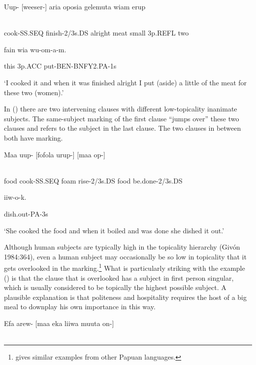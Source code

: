 \ea%
\label{ex:x1483}
\gll Uup-  [weeser-]  aria  oposia  gelemuta  wiam  erup \\
      \\
\glt
\z

cook-SS.SEQ  finish-2/3s.DS  alright  meat  small  3p.REFL  two

fain  wia  wu-om-a-m.

this  3p.ACC  put-BEN-BNFY2.PA-1s

`I cooked it and when it was finished alright I put (aside) a little of the meat for these two (women).'

In () there are two intervening clauses with different low-topicality inanimate subjects. The same-subject marking of the first clause ``jumps over'' these two clauses and refers to the subject in the last clause. The two clauses in between both have  marking. 

\ea%
\label{ex:x1476}
\gll Maa  uup- [fofola  urup-]  [maa  op-]  \\
      \\
\glt
\z

food  cook-SS.SEQ  foam  rise-2/3s.DS  food  be.done-2/3s.DS

iiw-o-k.

dish.out-PA-3s

`She cooked the food and when it boiled and was done she dished it out.'

Although human subjects are typically high in the topicality hierarchy (Giv\'on 1984:364), even a human subject may occasionally be so low in topicality that it gets overlooked in the  marking.\footnote{\citet[236-7]{Reesink1983a} gives similar examples from other Papuan languages.} What is particularly striking with the example () is that the clause that is overlooked has a subject in first person singular, which is usually considered to be topically the highest possible subject. A plausible explanation is that politeness and hospitality requires the host of a big meal to downplay his own importance in this way. 

\ea%
\label{ex:x1477}
\gll Efa  arew-  [maa  eka  liiwa  muuta  on-]  \\
      \\
\glt
\z

